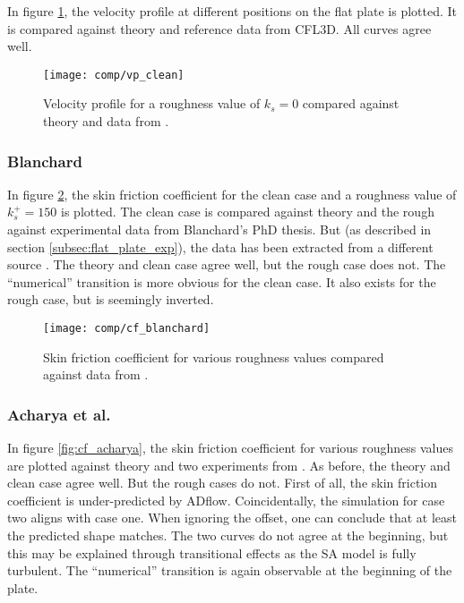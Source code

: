 \noindent In figure \ref{fig:vp_clean}, the velocity profile at different
positions on the flat plate is plotted. It is compared against theory and
reference data from CFL3D. All curves agree well.
\begin{figure}[H] \centering
  \texttt{[image: comp/vp\_clean]}
    \caption{Velocity profile for a roughness value of $k_{s} = 0$ compared
      against theory and  data from \cite{rumsey_flat}.}
    \label{fig:vp_clean}
\end{figure}

\subsubsection{Blanchard}
In figure \ref{fig:cf_blanchard}, the skin friction coefficient for the clean
case and a roughness value of $k_{s}^{+} = 150$ is plotted. The clean case is
compared against theory and the rough against experimental data from Blanchard's
PhD thesis. But (as described in section \ref{subsec:flat_plate_exp}), the data
has been extracted from a different source \cite{sa_rough}. The theory and clean
case agree well, but the rough case does not. The ``numerical'' transition is
more obvious for the clean case. It also exists for the rough case, but is
seemingly inverted.

\begin{figure}[H] \centering
  \texttt{[image: comp/cf\_blanchard]}
    \caption{Skin friction coefficient for various roughness values compared
      against data from \cite{sa_rough}.}
    \label{fig:cf_blanchard}
\end{figure}


\subsubsection{Acharya et al.}
In figure \ref{fig:cf_acharya}, the skin friction coefficient for various
roughness values are plotted against theory and two experiments from
\cite{Acharya1986}. As before, the theory and clean case agree well. But the
rough cases do not. First of all, the skin friction coefficient is
under-predicted by ADflow. Coincidentally, the simulation for case two aligns
with case one. When ignoring the offset, one can conclude that at least the
predicted shape matches. The two curves do not agree at the beginning, but this
may be explained through transitional effects as the SA model is fully
turbulent. The ``numerical'' transition is again observable at the beginning of
the plate.

